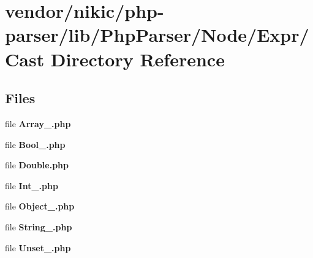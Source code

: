 \section{vendor/nikic/php-\/parser/lib/\+Php\+Parser/\+Node/\+Expr/\+Cast Directory Reference}
\label{dir_6d65335b59a87c84c707f61769c5e4fb}
\subsection*{Files}
\begin{DoxyCompactItemize}
\item 
file {\bf Array\+\_\+.\+php}
\item 
file {\bf Bool\+\_\+.\+php}
\item 
file {\bf Double.\+php}
\item 
file {\bf Int\+\_\+.\+php}
\item 
file {\bf Object\+\_\+.\+php}
\item 
file {\bf String\+\_\+.\+php}
\item 
file {\bf Unset\+\_\+.\+php}
\end{DoxyCompactItemize}
